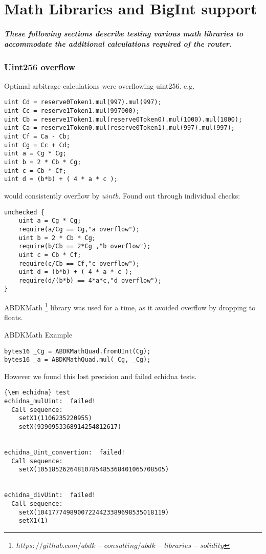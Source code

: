 \documentclass[runningheads]{llncs}
\begin{document}
\chapter{Math Libraries and BigInt support}

\paragraph{These following sections describe testing various math libraries to accommodate the additional calculations required of the router.}

\subsection{Uint256 overflow}
Optimal arbitrage calculations were overflowing uint256. e.g.
\label{Uint256 overflow:5}
\begin{verbatim}
uint Cd = reserve0Token1.mul(997).mul(997);
uint Cc = reserve1Token1.mul(997000);
uint Cb = reserve1Token1.mul(reserve0Token0).mul(1000).mul(1000);
uint Ca = reserve1Token0.mul(reserve0Token1).mul(997).mul(997);
uint Cf = Ca - Cb;
uint Cg = Cc + Cd;
uint a = Cg * Cg;
uint b = 2 * Cb * Cg;
uint c = Cb * Cf;
uint d = (b*b) + ( 4 * a * c ); 
\end{verbatim}

would consistently overflow by $uint b$. Found out through individual checks:
\begin{verbatim}
unchecked {
    uint a = Cg * Cg;
    require(a/Cg == Cg,"a overflow");
    uint b = 2 * Cb * Cg;
    require(b/Cb == 2*Cg ,"b overflow");
    uint c = Cb * Cf;
    require(c/Cb == Cf,"c overflow");
    uint d = (b*b) + ( 4 * a * c );
    require(d/(b*b) == 4*a*c,"d overflow");
}
\end{verbatim}
\newpage

ABDKMath \footnote{$https://github.com/abdk-consulting/abdk-libraries-solidity$} library was used for a time, as it avoided overflow by dropping to floats.

ABDKMath Example
\begin{verbatim}
bytes16 _Cg = ABDKMathQuad.fromUInt(Cg);
bytes16 _a = ABDKMathQuad.mul(_Cg, _Cg);
\end{verbatim}

However we found this lost precision and failed echidna tests.
\label{Uint256 overflow:5}
\begin{verbatim}
{\em echidna} test
echidna_mulUint:  failed!
  Call sequence:
    setX1(1106235220955)
    setX(9390953368914254812617)


echidna_Uint_convertion:  failed!
  Call sequence:
    setX(10518526264810785485368401065708505)


echidna_divUint:  failed!
  Call sequence:
    setX(10417774989007224423389698535018119)
    setX1(1)
\end{verbatim}
\end{document}
